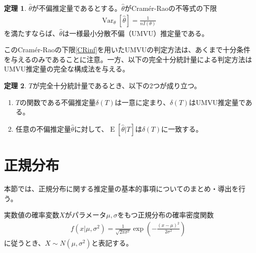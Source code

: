 \documentclass[11pt]{ltjsarticle}
\theoremstyle{definition}
\newtheorem{theorem}{定理}[section]
\DeclareMathOperator{\E}{E}
\DeclareMathOperator{\Var}{Var}
\begin{document}
\begin{theorem}\label{th:UMVU1}
    $\widehat{\theta}$が不偏推定量であるとする。$\widehat{\theta}$がCram\'{e}r-Raoの不等式の下限
    \begin{align}\label{CRinf}
        \Var_\theta[\widehat{\theta}] = \frac{1}{nI(\theta)}
    \end{align}
    を満たすならば、$\widehat{\theta}$は一様最小分散不偏（UMVU）推定量である。
\end{theorem}

このCram\'{e}r-Raoの下限\eqref{CRinf}を用いたUMVUの判定方法は、あくまで十分条件を与えるのみであることに注意。一方、以下の完全十分統計量による判定方法はUMVU推定量の完全な構成法を与える。

\begin{theorem}\label{th:UMVU2}
    $T$が完全十分統計量であるとき、以下の2つが成り立つ。
    \begin{enumerate}[(1)]
        \item $T$の関数である不偏推定量$\delta(T)$は一意に定まり、$\delta(T)$はUMVU推定量である。
        \item 任意の不偏推定量$\hat{\theta}$に対して、$\E[\hat{\theta}|T]$は$\delta(T)$に一致する。
    \end{enumerate}
\end{theorem}
\section{正規分布}
本節では、正規分布に関する推定量の基本的事項についてのまとめ・導出を行う。

実数値の確率変数$X$がパラメータ$\mu, \sigma$をもつ正規分布の確率密度関数
\begin{align}
    f(x|\mu, \sigma^2) = \frac{1}{\sqrt{2\pi \sigma^2}}\exp\left(-\frac{(x - \mu)^2}{2\sigma^2}\right)
\end{align}
に従うとき、$X\sim N(\mu, \sigma^2)$と表記する。
\end{document}
